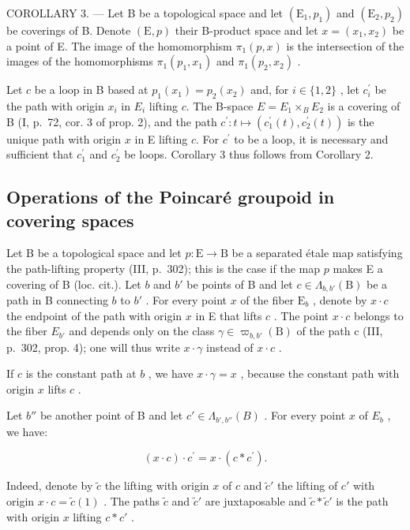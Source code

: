 COROLLARY 3. --- Let B be a topological space and let \((\mathrm{E}_{1}, p_{1})\) and \((\mathrm{E}_{2}, p_{2})\) be coverings of B. Denote \((\mathrm{E}, p)\) their B-product space and let \(x = (x_{1}, x_{2})\) be a point of E. The image of the homomorphism \(\pi_{1}(p, x)\) is the intersection of the images of the homomorphisms \(\pi_{1}(p_{1}, x_{1})\) and \(\pi_{1}(p_{2}, x_{2})\) .

Let \(c\) be a loop in B based at \(p_{1}(x_{1}) = p_{2}(x_{2})\) and, for \(i \in \{1, 2\}\) , let \(c_{i}^{\prime}\) be the path with origin \(x_i\) in \(E_i\) lifting \(c\). The B-space \(E = E_{1} \times_{B} E_{2}\) is a covering of B (I, p.~72, cor. 3 of prop. 2), and the path \(c^{\prime}: t \mapsto (c_{1}^{\prime}(t), c_{2}^{\prime}(t))\) is the unique path with origin \(x\) in E lifting \(c\). For \(c^{\prime}\) to be a loop, it is necessary and sufficient that \(c_{1}^{\prime}\) and \(c_{2}^{\prime}\) be loops. Corollary 3 thus follows from Corollary 2.

\subsection{Operations of the Poincaré groupoid in covering spaces}

Let B be a topological space and let \(p \colon \mathrm{E} \to \mathrm{B}\) be a separated étale map satisfying the path-lifting property (III, p.~302); this is the case if the map \(p\) makes E a covering of B (loc. cit.). Let \(b\) and \(b'\) be points of B and let \(c \in \Lambda_{b,b'}(\mathrm{B})\) be a path in B connecting \(b\) to \(b'\) . For every point \(x\) of the fiber \(\mathrm{E}_b\) , denote by \(x \cdot c\) the endpoint of the path with origin \(x\) in E that lifts \(c\) . The point \(x \cdot c\) belongs to the fiber \(E_{b'}\) and depends only on the class \(\gamma \in \varpi_{b,b'}(\mathrm{B})\) of the path c (III, p.~302, prop. 4); one will thus write \(x \cdot \gamma\) instead of \(x \cdot c\) .

If \(c\) is the constant path at \(b\) , we have \(x \cdot \gamma = x\) , because the constant path with origin \(x\) lifts \(c\) .

Let \(b''\) be another point of B and let \(c' \in \Lambda_{b',b''}(B)\) . For every point \(x\) of \(E_b\) , we have:

\[
(x \cdot c) \cdot c ^ {\prime} = x \cdot (c * c ^ {\prime}).\tag{1}
\]

Indeed, denote by \(\widetilde{c}\) the lifting with origin \(x\) of \(c\) and \(\widetilde{c}'\) the lifting of \(c'\) with origin \(x \cdot c = \widetilde{c}(1)\) . The paths \(\widetilde{c}\) and \(\widetilde{c}'\) are juxtaposable and \(\widetilde{c} * \widetilde{c}'\) is the path with origin \(x\) lifting \(c * c'\) .

